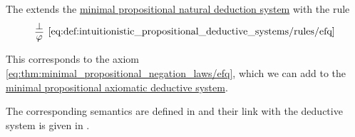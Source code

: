 \begin{definition}\label{def:intuitionistic_propositional_deductive_systems}
  The  extends the \hyperref[def:minimal_propositional_natural_deduction_system]{minimal propositional natural deduction system} with the rule
  \begin{equation*}\taglabel[\textrm{EFQ}]{eq:def:intuitionistic_propositional_deductive_systems/rules/efq}
    \begin{prooftree}
      \hypo{ \bot }
      \infer1[\ref{eq:def:intuitionistic_propositional_deductive_systems/rules/efq}]{ \varphi }
    \end{prooftree}
  \end{equation*}

  This corresponds to the axiom \eqref{eq:thm:minimal_propositional_negation_laws/efq}, which we can add to the \hyperref[def:minimal_propositional_axiomatic_deductive_system]{minimal propositional axiomatic deductive system}.

  The corresponding semantics are defined in  and their link with the deductive system is given in .
\end{definition}

